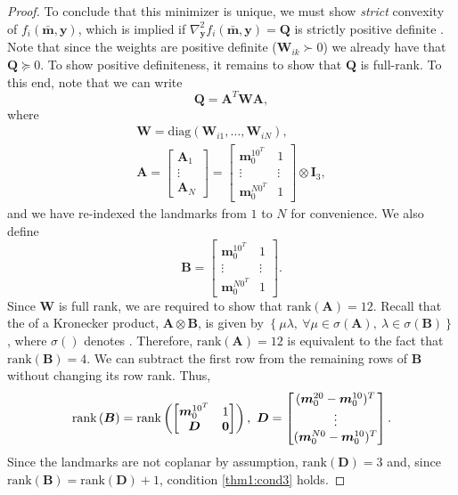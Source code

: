 \documentclass[lettersize,journal]{IEEEtran}
\newcommand{\rank}[1]{\mbox{rank}\left(#1\right)}
\newcommand{\diag}[1]{\mbox{diag}\left(#1\right)}
\newcommand{\rev}[1]{\color{red}{#1}\color{black}}
\begin{document}
\begin{proof}
To conclude that this minimizer is unique, we must show \emph{strict} convexity of $f_i(\bar{\bm{m}},\bm{y})$, which is implied if $\nabla_{\bm{y}}^2 f_i(\bar{\bm{m}},\bm{y}) = \bm{Q} $ is strictly positive definite \cite{boydConvexOptimization2004}. Note that since the weights are positive definite ($\bm{W}_{ik}\succ 0 $) we already have that $\bm{Q} \succeq 0$. To show positive definiteness, it remains to show that $\bm{Q}$ is full-rank. To this end, note that we can write
\begin{equation}
	\bm{Q} = \bm{A}^T \bm{W} \bm{A},
\end{equation}
where
\begin{gather}
	\bm{W} = \diag{\bm{W}_{i1},\ldots,\bm{W}_{iN}},\\
	\bm{A} = \begin{bmatrix}
		 \bm{A}_1 \\ \vdots \\ \bm{A}_N
	\end{bmatrix} = \begin{bmatrix}
		 \bm{m}_0^{10^T} & 1 \\
		 \vdots& \vdots\\
		 \bm{m}_0^{N0^T} & 1
	\end{bmatrix}\otimes \bm{I}_3,
\end{gather}
and we have re-indexed the landmarks from $1$ to $N$ for convenience. We also define
\begin{equation*}
	\bm{B} = \begin{bmatrix}
		\bm{m}_0^{10^T} & 1 \\
		\vdots&\vdots\\
		\bm{m}_0^{N0^T} & 1
	\end{bmatrix}.
\end{equation*}
Since $\bm{W}$ is full rank, we are required to show that $\rank{\bm{A}} = 12$. 
Recall that the \rev{singular values } of a Kronecker product, $\bm{A}\otimes\bm{B}$, is given by $\left\{ \mu\lambda,~ \forall \mu \in \sigma(\bm{A}),~ \lambda \in \sigma(\bm{B})\right\}$, where $\sigma()$ denotes \rev{the set of singular values}.
Therefore, $\rank{\bm{A}} = 12$ is equivalent to the fact that $\rank{\bm{B}}=4$. We can subtract the first row from the remaining rows of $\bm{B}$ without changing its row rank. Thus,
\begin{equation*}
	\rank{\bm{B}} = \rank{\begin{bmatrix}
			\bm{m}_0^{10^T} & 1 \\
			\bm{D} & \bm{0}
		\end{bmatrix}}, ~ \bm{D} = \begin{bmatrix}
		(\bm{m}_0^{20}-\bm{m}_0^{10})^T  \\
		\vdots\\
		(\bm{m}_0^{N0}-\bm{m}_0^{10})^T 
	\end{bmatrix}.\\	
\end{equation*}
Since the landmarks are not coplanar by assumption, $\rank{\bm{D}}=3$ and, since $\rank{\bm{B}} = \rank{\bm{D}} + 1$, condition \ref{thm1:cond3} holds.
 

\end{proof}
\end{document}
